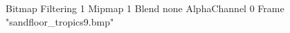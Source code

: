 {Bitmap
	{Filtering 1}
	{Mipmap 1}
	{Blend none}
	{AlphaChannel 0}
	{Frame "sandfloor_tropics9.bmp"}
}
